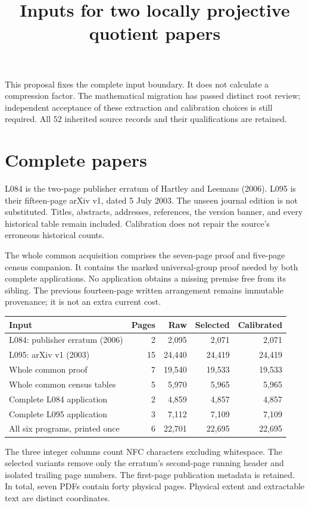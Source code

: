 \documentclass[11pt,a4paper]{article}
\title{Inputs for two locally projective quotient papers}
\author{}\date{}
\begin{document}
\maketitle
 This proposal fixes the complete input boundary. It does not calculate a
 compression factor. The mathematical migration has passed distinct root review;
 independent acceptance of these extraction and calibration choices is still
 required. All 52 inherited source records and their qualifications are retained.

 \section*{Complete papers}
 L084 is the two-page publisher erratum of Hartley and Leemans (2006).
 L095 is their fifteen-page arXiv v1, dated 5 July 2003. The unseen journal
 edition is not substituted. Titles, abstracts, addresses, references, the
 version banner, and every historical table remain included. Calibration does
 not repair the source's erroneous historical counts.

 The whole common acquisition comprises the seven-page proof and five-page
 census companion. It contains the marked universal-group proof needed by
 both complete applications. No application obtains a missing premise free
 from its sibling. The previous fourteen-page written arrangement remains
 immutable provenance; it is not an extra current cost.

 \begin{center}\small
 \begin{tabular}{p{62mm}rrrr}\toprule
 Input & Pages & Raw & Selected & Calibrated\\\midrule
 L084: publisher erratum (2006) & 2 & 2,095 & 2,071 & 2,071\\
L095: arXiv v1 (2003) & 15 & 24,440 & 24,419 & 24,419\\
Whole common proof & 7 & 19,540 & 19,533 & 19,533\\
Whole common census tables & 5 & 5,970 & 5,965 & 5,965\\
Complete L084 application & 2 & 4,859 & 4,857 & 4,857\\
Complete L095 application & 3 & 7,112 & 7,109 & 7,109\\
All six programs, printed once & 6 & 22,701 & 22,695 & 22,695\\
 \bottomrule\end{tabular}\end{center}
 The three integer columns count NFC characters excluding whitespace.
 The selected variants remove only the erratum's second-page running header
 and isolated trailing page numbers. The first-page publication metadata is
 retained. In total, seven PDFs contain forty physical pages. Physical extent
 and extractable text are distinct coordinates.
\end{document}
